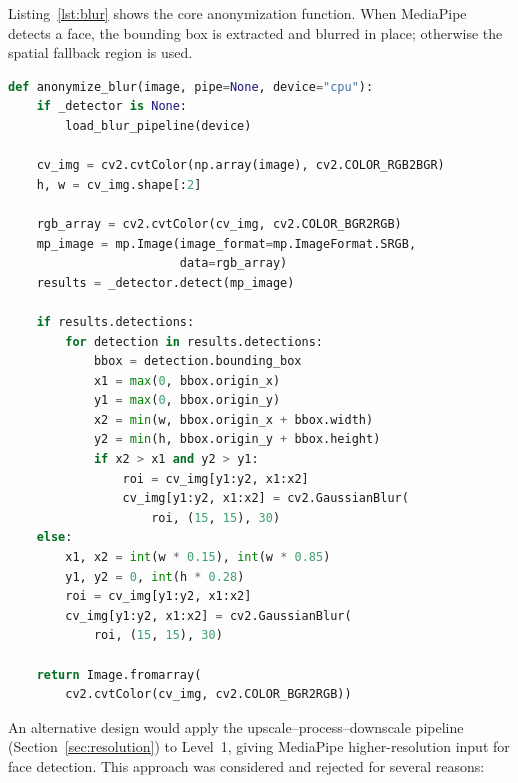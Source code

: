 Listing~\ref{lst:blur} shows the core anonymization function. When MediaPipe detects a face, the bounding box is extracted and blurred in place; otherwise the spatial fallback region is used.

\begin{lstlisting}[language=Python, caption={Level~1 blur anonymization (\texttt{blur\_anonymizer.py}).}, label=lst:blur]
def anonymize_blur(image, pipe=None, device="cpu"):
    if _detector is None:
        load_blur_pipeline(device)

    cv_img = cv2.cvtColor(np.array(image), cv2.COLOR_RGB2BGR)
    h, w = cv_img.shape[:2]

    rgb_array = cv2.cvtColor(cv_img, cv2.COLOR_BGR2RGB)
    mp_image = mp.Image(image_format=mp.ImageFormat.SRGB,
                        data=rgb_array)
    results = _detector.detect(mp_image)

    if results.detections:
        for detection in results.detections:
            bbox = detection.bounding_box
            x1 = max(0, bbox.origin_x)
            y1 = max(0, bbox.origin_y)
            x2 = min(w, bbox.origin_x + bbox.width)
            y2 = min(h, bbox.origin_y + bbox.height)
            if x2 > x1 and y2 > y1:
                roi = cv_img[y1:y2, x1:x2]
                cv_img[y1:y2, x1:x2] = cv2.GaussianBlur(
                    roi, (15, 15), 30)
    else:
        x1, x2 = int(w * 0.15), int(w * 0.85)
        y1, y2 = 0, int(h * 0.28)
        roi = cv_img[y1:y2, x1:x2]
        cv_img[y1:y2, x1:x2] = cv2.GaussianBlur(
            roi, (15, 15), 30)

    return Image.fromarray(
        cv2.cvtColor(cv_img, cv2.COLOR_BGR2RGB))
\end{lstlisting}

An alternative design would apply the upscale--process--downscale pipeline (Section~\ref{sec:resolution}) to Level~1, giving MediaPipe higher-resolution input for face detection. This approach was considered and rejected for several reasons:

